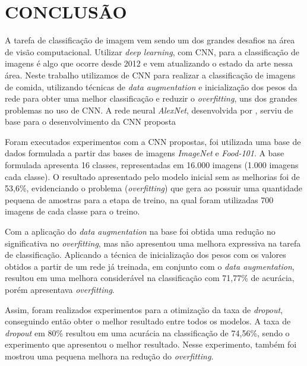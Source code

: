 
\chapter{CONCLUSÃO}
\label{chap:conclusao}

A tarefa de classificação de imagem vem sendo um dos grandes desafios na área de visão computacional. Utilizar \textit{deep learning}, com CNN, para a classificação de imagens é algo que ocorre desde 2012 e vem atualizando o estado da arte nessa área. Neste trabalho utilizamos de CNN para realizar a classificação de imagens de comida, utilizando técnicas de \textit{data augmentation} e inicialização dos pesos da rede para obter uma melhor classificação e reduzir o \textit{overfitting}, uns dos grandes problemas no uso de CNN. A rede neural \textit{AlexNet}, desenvolvida por , serviu de base para o desenvolvimento da CNN proposta

\par Foram executados experimentos com a CNN propostas, foi utilizada uma base de dados formulada a partir das bases de imagens \textit{ImageNet}\cite{deng2009imagenet} e \textit{Food-101}\cite{bossard14}. A base formulada apresenta 16 classes, representadas em 16.000 imagens (1.000 imagens cada classe). O resultado apresentado pelo modelo inicial sem as melhorias foi de 53,6\%, evidenciando o problema (\textit{overfitting}) que gera ao possuir uma quantidade pequena de amostras para a etapa de treino, na qual foram utilizadas 700 imagens de cada classe para o treino.

\par Com a aplicação do \textit{data augmentation} na base foi obtida uma redução no significativa no \textit{overfitting}, mas não apresentou uma melhora expressiva na tarefa de classificação. Aplicando a técnica de inicialização dos pesos com os valores obtidos a partir de um rede já treinada, em conjunto com o \textit{data augmentation}, resultou em uma melhora considerável na classificação com 71,77\% de acurácia, porém apresentava \textit{overfitting}.

\par Assim, foram realizados experimentos para a otimização da taxa de \textit{dropout}, conseguindo então obter o melhor resultado entre todos os modelos. A taxa de \textit{dropout} em 80\% resultou em uma acurácia na classificação de 74,56\%, sendo o experimento que apresentou o melhor resultado. Nesse experimento, também foi mostrou uma pequena melhora na redução do \textit{overfitting}.

